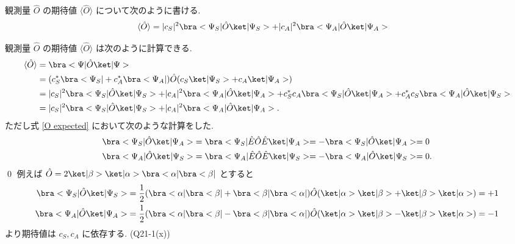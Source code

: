 \documentclass[uplatex,dvipdfmx,a4paper,11pt]{jlreq}
\makeatletter
\numberwithin{equation}{section}
\theoremstyle{definition}
\renewenvironment{proof}[1][\proofname]{\par
  \normalfont
  \topsep6\p@\@plus6\p@ \trivlist
  \item[\hskip\labelsep{\bfseries #1}\@addpunct{\bfseries}]\ignorespaces\quad\par
}{%
  \qed\endtrivlist\@endpefalse
}
\renewcommand\proofname{証明}
\makeatother
\begin{document}
\begin{proposition}[Q21-1(ix)]
  観測量 $\hat{O}$ の期待値 $\langle\hat{O}\rangle$ について次のように書ける.
  \begin{align}
    \langle\hat{O}\rangle & = |c_S|^2\bra<\Psi_S|\hat{O}\ket|\Psi_S> + |c_A|^2\bra<\Psi_A|\hat{O}\ket|\Psi_A>
  \end{align}
\end{proposition}
\begin{proof}
  観測量 $\hat{O}$ の期待値 $\langle\hat{O}\rangle$ は次のように計算できる.
  \begin{align}
    \langle\hat{O}\rangle & = \bra<\Psi|\hat{O}\ket|\Psi>                                                                                                                                         \\
                          & = (c_S^*\bra<\Psi_S| + c_A^*\bra<\Psi_A|)\hat{O}(c_S\ket|\Psi_S> + c_A\ket|\Psi_A>)                                                                                   \\
                          & = |c_S|^2\bra<\Psi_S|\hat{O}\ket|\Psi_S> + |c_A|^2\bra<\Psi_A|\hat{O}\ket|\Psi_A> + c_S^*c_A\bra<\Psi_S|\hat{O}\ket|\Psi_A> + c_A^*c_S\bra<\Psi_A|\hat{O}\ket|\Psi_S> \\
                          & = |c_S|^2\bra<\Psi_S|\hat{O}\ket|\Psi_S> + |c_A|^2\bra<\Psi_A|\hat{O}\ket|\Psi_A>.\label{O expected}
  \end{align}
  ただし式 \eqref{O expected} において次のような計算をした.
  \begin{align}
    \bra<\Psi_S|\hat{O}\ket|\Psi_A> & = \bra<\Psi_S|\hat{E}\hat{O}\hat{E}\ket|\Psi_A> = -\bra<\Psi_S|\hat{O}\ket|\Psi_A> = 0  \\
    \bra<\Psi_A|\hat{O}\ket|\Psi_S> & = \bra<\Psi_A|\hat{E}\hat{O}\hat{E}\ket|\Psi_S> = -\bra<\Psi_A|\hat{O}\ket|\Psi_S> = 0.
  \end{align}
\end{proof}
例えば $\hat{O} = 2\ket|\beta>\ket|\alpha>\bra<\alpha|\bra<\beta|$ とすると
\begin{align}
  \bra<\Psi_S|\hat{O}\ket|\Psi_S> & = \frac{1}{2}(\bra<\alpha|\bra<\beta| + \bra<\beta|\bra<\alpha|)\hat{O}(\ket|\alpha>\ket|\beta> + \ket|\beta>\ket|\alpha>) = +1 \\
  \bra<\Psi_A|\hat{O}\ket|\Psi_A> & = \frac{1}{2}(\bra<\alpha|\bra<\beta| - \bra<\beta|\bra<\alpha|)\hat{O}(\ket|\alpha>\ket|\beta> - \ket|\beta>\ket|\alpha>) = -1
\end{align}
より期待値は $c_S, c_A$ に依存する. (Q21-1(x))
\end{document}
